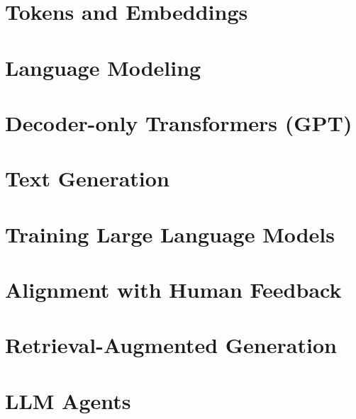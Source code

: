 \chapter{Tokens and Embeddings}


\chapter{Language Modeling}


\chapter{Decoder-only Transformers (GPT)}


\chapter{Text Generation}


\chapter{Training Large Language Models}



\chapter{Alignment with Human Feedback}


\chapter{Retrieval-Augmented Generation}


\chapter{LLM Agents}

